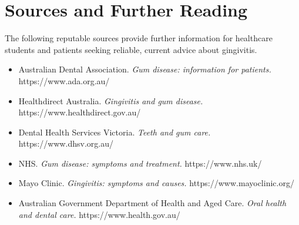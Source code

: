 \section*{Sources and Further Reading}
The following reputable sources provide further information for healthcare students and patients seeking reliable, current advice about gingivitis.

\begin{itemize}
    \item Australian Dental Association. \textit{Gum disease: information for patients.} https://www.ada.org.au/
    \item Healthdirect Australia. \textit{Gingivitis and gum disease.} https://www.healthdirect.gov.au/
    \item Dental Health Services Victoria. \textit{Teeth and gum care.} https://www.dhsv.org.au/
    \item NHS. \textit{Gum disease: symptoms and treatment.} https://www.nhs.uk/
    \item Mayo Clinic. \textit{Gingivitis: symptoms and causes.} https://www.mayoclinic.org/
    \item Australian Government Department of Health and Aged Care. \textit{Oral health and dental care.} https://www.health.gov.au/
\end{itemize}
